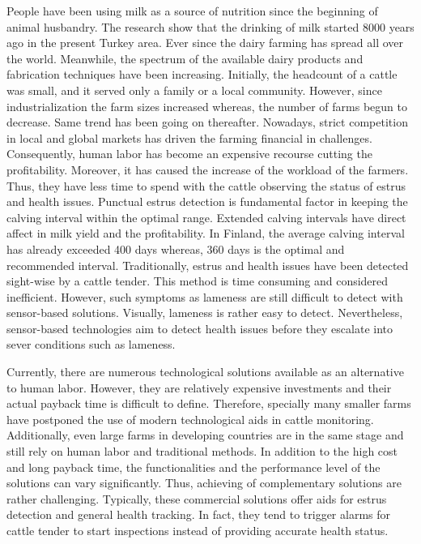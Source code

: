 \documentclass[english,12pt,a4paper,pdftex,elec,utf8]{aaltothesis}
\begin{document}
People have been using milk as a source of nutrition since the beginning of animal husbandry. The research show that the drinking of milk started 8000 years ago in the present Turkey area. Ever since the dairy farming has spread all over the world. Meanwhile, the spectrum of the available dairy products and fabrication techniques have been increasing. Initially, the headcount of a cattle was small, and it served only a family or a local community. However, since industrialization the farm sizes increased whereas, the number of farms begun to decrease. Same trend has been going on thereafter. Nowadays, strict competition in local and global markets has driven the farming financial in challenges. Consequently, human labor has become an expensive recourse cutting the profitability. Moreover, it has caused the increase of the workload of the farmers. Thus, they have less time to spend with the cattle observing the status of estrus and health issues. Punctual estrus detection is fundamental factor in keeping the calving interval within the optimal range. Extended calving intervals have direct affect in milk yield and the profitability. In Finland, the average calving interval has already exceeded 400 days whereas, 360 days is the optimal and recommended interval. Traditionally, estrus and health issues have been detected sight-wise by a cattle tender. This method is time consuming and considered inefficient. However, such symptoms as lameness are still difficult to detect with sensor-based solutions. Visually, lameness is rather easy to detect. Nevertheless, sensor-based technologies aim to detect health issues before they escalate into sever conditions such as lameness.

Currently, there are numerous technological solutions available as an alternative to human labor. However, they are relatively expensive investments and their actual payback time is difficult to define. Therefore, specially many smaller farms have postponed the use of modern technological aids in cattle monitoring. Additionally, even large farms in developing countries are in the same stage and still rely on human labor and traditional methods. In addition to the high cost and long payback time, the functionalities and the performance level of the solutions can vary significantly. Thus, achieving of complementary solutions are rather challenging. Typically, these commercial solutions offer aids for estrus detection and general health tracking. In fact, they tend to trigger alarms for cattle tender to start inspections instead of providing accurate health status.
\end{document}
